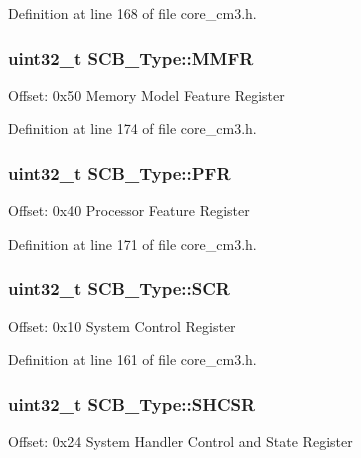 Definition at line 168 of file core\+\_\+cm3.\+h.

\subsubsection[{\texorpdfstring{M\+M\+FR}{MMFR}}]{ {\bf uint32\+\_\+t} S\+C\+B\+\_\+\+Type\+::\+M\+M\+FR}\hypertarget{struct_s_c_b___type_a40b4fec8c296cba02baec983378cbcfd}{}\label{struct_s_c_b___type_a40b4fec8c296cba02baec983378cbcfd}
Offset\+: 0x50 Memory Model Feature Register 

Definition at line 174 of file core\+\_\+cm3.\+h.

\subsubsection[{\texorpdfstring{P\+FR}{PFR}}]{ {\bf uint32\+\_\+t} S\+C\+B\+\_\+\+Type\+::\+P\+FR}\hypertarget{struct_s_c_b___type_aeb36c109d2fdb4eb4d6c4dc29154d77f}{}\label{struct_s_c_b___type_aeb36c109d2fdb4eb4d6c4dc29154d77f}
Offset\+: 0x40 Processor Feature Register 

Definition at line 171 of file core\+\_\+cm3.\+h.

\subsubsection[{\texorpdfstring{S\+CR}{SCR}}]{ {\bf uint32\+\_\+t} S\+C\+B\+\_\+\+Type\+::\+S\+CR}\hypertarget{struct_s_c_b___type_abfad14e7b4534d73d329819625d77a16}{}\label{struct_s_c_b___type_abfad14e7b4534d73d329819625d77a16}
Offset\+: 0x10 System Control Register 

Definition at line 161 of file core\+\_\+cm3.\+h.

\subsubsection[{\texorpdfstring{S\+H\+C\+SR}{SHCSR}}]{ {\bf uint32\+\_\+t} S\+C\+B\+\_\+\+Type\+::\+S\+H\+C\+SR}\hypertarget{struct_s_c_b___type_ae9891a59abbe51b0b2067ca507ca212f}{}\label{struct_s_c_b___type_ae9891a59abbe51b0b2067ca507ca212f}
Offset\+: 0x24 System Handler Control and State Register 


